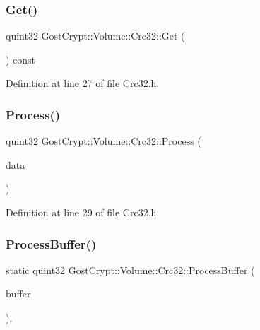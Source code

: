 \subsubsection{\texorpdfstring{Get()}{Get()}}
{\footnotesize\ttfamily quint32 Gost\+Crypt\+::\+Volume\+::\+Crc32\+::\+Get (\begin{DoxyParamCaption}{ }\end{DoxyParamCaption}) const\hspace{0.3cm}{\ttfamily [inline]}}



Definition at line 27 of file Crc32.\+h.

\mbox{\label{class_gost_crypt_1_1_volume_1_1_crc32_aab8611a67b50a47901f5b5bbf485e4ae}} 
\subsubsection{\texorpdfstring{Process()}{Process()}}
{\footnotesize\ttfamily quint32 Gost\+Crypt\+::\+Volume\+::\+Crc32\+::\+Process (\begin{DoxyParamCaption}\item[{quint8}]{data }\end{DoxyParamCaption})\hspace{0.3cm}{\ttfamily [inline]}}



Definition at line 29 of file Crc32.\+h.

\mbox{\label{class_gost_crypt_1_1_volume_1_1_crc32_a2edf1d5466c4a1ae44712e253bbaccd2}} 
\subsubsection{\texorpdfstring{Process\+Buffer()}{ProcessBuffer()}}
{\footnotesize\ttfamily static quint32 Gost\+Crypt\+::\+Volume\+::\+Crc32\+::\+Process\+Buffer (\begin{DoxyParamCaption}\item[{const \hyperlink{class_gost_crypt_1_1_buffer_ptr}{Buffer\+Ptr} \&}]{buffer }\end{DoxyParamCaption})\hspace{0.3cm}{\ttfamily [inline]}, {\ttfamily [static]}}



